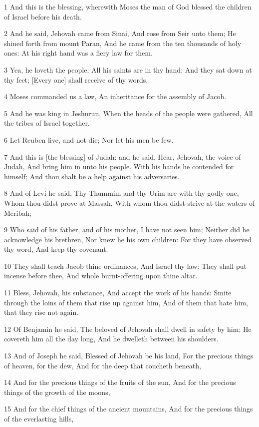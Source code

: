 \par 1 And this is the blessing, wherewith Moses the man of God blessed the children of Israel before his death.
\par 2 And he said, Jehovah came from Sinai, And rose from Seir unto them; He shined forth from mount Paran, And he came from the ten thousands of holy ones: At his right hand was a fiery law for them.
\par 3 Yea, he loveth the people; All his saints are in thy hand: And they sat down at thy feet; [Every one] shall receive of thy words.
\par 4 Moses commanded us a law, An inheritance for the assembly of Jacob.
\par 5 And he was king in Jeshurun, When the heads of the people were gathered, All the tribes of Israel together.
\par 6 Let Reuben live, and not die; Nor let his men be few.
\par 7 And this is [the blessing] of Judah: and he said, Hear, Jehovah, the voice of Judah, And bring him in unto his people. With his hands he contended for himself; And thou shalt be a help against his adversaries.
\par 8 And of Levi he said, Thy Thummim and thy Urim are with thy godly one, Whom thou didst prove at Massah, With whom thou didst strive at the waters of Meribah;
\par 9 Who said of his father, and of his mother, I have not seen him; Neither did he acknowledge his brethren, Nor knew he his own children: For they have observed thy word, And keep thy covenant.
\par 10 They shall teach Jacob thine ordinances, And Israel thy law: They shall put incense before thee, And whole burnt-offering upon thine altar.
\par 11 Bless, Jehovah, his substance, And accept the work of his hands: Smite through the loins of them that rise up against him, And of them that hate him, that they rise not again.
\par 12 Of Benjamin he said, The beloved of Jehovah shall dwell in safety by him; He covereth him all the day long, And he dwelleth between his shoulders.
\par 13 And of Joseph he said, Blessed of Jehovah be his land, For the precious things of heaven, for the dew, And for the deep that coucheth beneath,
\par 14 And for the precious things of the fruits of the sun, And for the precious things of the growth of the moons,
\par 15 And for the chief things of the ancient mountains, And for the precious things of the everlasting hills,
